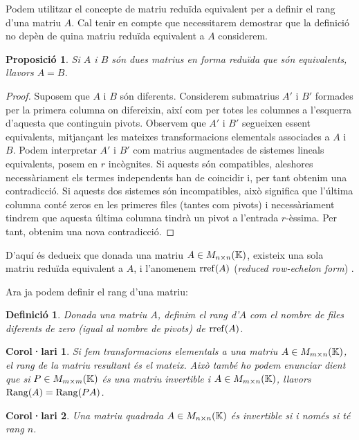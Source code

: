 \documentclass[
  11pt,
]{book}
\numberwithin{dummy}{section}
\theoremstyle{maincolornumbox}
\theoremstyle{blacknumex}
\theoremstyle{blacknumbox}
\newtheorem{definitionT}{Definició}[chapter]
\newtheorem{corollaryT}{Corol·lari}[chapter]
\theoremstyle{maincolornum}
\newtheorem{propositionT}{Proposició}[chapter]
\newenvironment{proposition}{\begin{pBox}\begin{propositionT}}{\end{propositionT}\end{pBox}}
\newenvironment{corollary}{\begin{cBox}\begin{corollaryT}}{\end{corollaryT}\end{cBox}}
\newenvironment{definition}{\begin{dBox}\begin{definitionT}}{\end{definitionT}\end{dBox}}
\begin{document}
Podem utilitzar el concepte de matriu reduïda equivalent per a definir
el rang d'una matriu \(A\). Cal tenir en compte que necessitarem demostrar
que la definició no depèn de quina matriu reduïda equivalent a \(A\)
considerem.

\begin{proposition}
Si \(A\) i \(B\) són dues matrius en forma reduïda que són equivalents,
llavors \(A=B\).
\end{proposition}

\begin{proof}
Suposem que \(A\) i \(B\) són diferents. Considerem submatrius \(A'\)
i \(B'\) formades per la primera columna on difereixin, així com per totes
les columnes a l'esquerra d'aquesta que continguin pivots. Observem que
\(A'\) i \(B'\) segueixen essent equivalents, mitjançant les mateixes
transformacions elementals associades a \(A\) i \(B\). Podem interpretar
\(A'\) i \(B'\) com matrius augmentades de sistemes lineals equivalents,
posem en \(r\) incògnites. Si aquests són compatibles, aleshores
necessàriament els termes independents han de coincidir i, per tant
obtenim una contradicció. Si aquests dos sistemes són incompatibles,
això significa que l'última columna conté zeros en les primeres files
(tantes com pivots) i necessàriament tindrem que aquesta última columna
tindrà un pivot a l'entrada \(r\)-èssima. Per tant, obtenim una nova
contradicció.
\end{proof}

D'aquí és dedueix que donada una matriu \(A\in M_{n\times n}(\mathbb{K})\),
existeix una sola matriu reduïda equivalent a \(A\), i l'anomenem
\(\operatorname{rref}(A)\) (\emph{reduced row-echelon form}) .

Ara ja podem definir el rang d'una matriu:

\begin{definition}
Donada una matriu \(A\), definim el \emph{rang d'\(A\)} com el nombre de files
diferents de zero (igual al nombre de pivots) de \(\operatorname{rref}(A)\).
\end{definition}

\begin{corollary}
Si fem transformacions elementals a una matriu \(A\in M_{m\times n}(\mathbb{K})\),
el rang de la matriu resultant és el mateix. Això també ho podem
enunciar dient que si \(P\in M_{m\times m}(\mathbb{K})\) és una matriu invertible
i \(A\in M_{m\times n}(\mathbb{K})\), llavors \(\operatorname{Rang}(A)=\operatorname{Rang}(PA)\).
\end{corollary}

\begin{corollary}
Una matriu quadrada \(A\in M_{n\times n}(\mathbb{K})\) és invertible si i només si
té rang \(n\).
\end{corollary}
\end{document}
